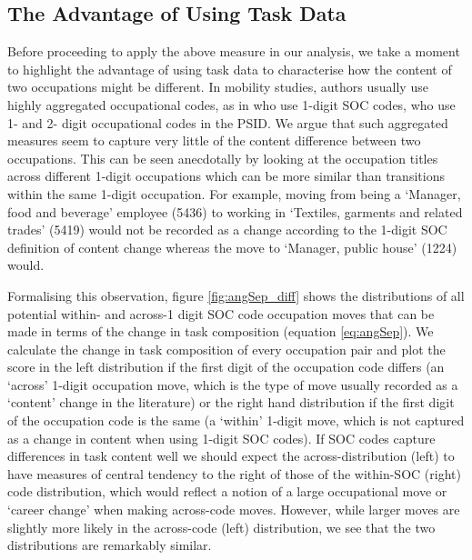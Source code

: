 \documentclass[11pt, oneside]{article}
\begin{document}
	
	

	
	\subsection{The Advantage of Using Task Data}
	\label{sec:advantageTasks}
	Before proceeding to apply the above measure in our analysis, we take a moment to highlight the advantage of using task data to characterise how the content of two occupations might be different. In mobility studies, authors usually use highly aggregated occupational codes, as in \cite{Carrillo-Tudela2016} who use 1-digit SOC codes, \cite{kambourov2009occupational} who use 1- and 2- digit occupational codes in the PSID. We argue that such aggregated measures seem to capture very little of the content difference between two occupations. This can be seen anecdotally by looking at the occupation titles across different 1-digit occupations which can be more similar than transitions within the same 1-digit occupation. For example, moving from being a `Manager, food and beverage' employee (5436) to working in `Textiles, garments and related trades' (5419) would not be recorded as a change according to the 1-digit SOC definition of content change whereas the move to `Manager, public house' (1224) would. 
	
	\vspace{2mm}
	
	Formalising this observation, figure \ref{fig:angSep_diff} shows the distributions of all potential within- and across-1 digit SOC code occupation moves that can be made in terms of the change in task composition (equation \ref{eq:angSep}). We calculate the change in task composition of every occupation pair and plot the score in the left distribution if the first digit of the occupation code differs (an `across' 1-digit occupation move, which is the type of move usually recorded as a `content' change in the literature) or the right hand distribution if the first digit of the occupation code is the same (a `within' 1-digit move, which is not captured as a change in content when using 1-digit SOC codes). If SOC codes capture differences in task content well we should expect the across-distribution (left) to have measures of central tendency to the right of those of the within-SOC (right) code distribution, which would reflect a notion of a large occupational move or `career change' when making across-code moves. However, while larger moves are slightly more likely in the across-code (left) distribution, we see that the two distributions are remarkably similar. 
	
\end{document}
